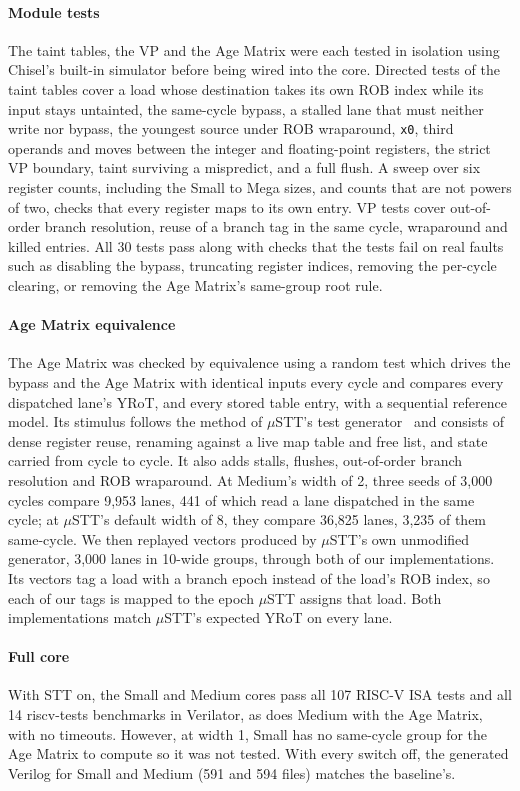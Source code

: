 
\paragraph{Module tests}
The taint tables, the VP and the Age Matrix were each tested in isolation
using Chisel's built-in simulator before being wired into the core. Directed
tests of the taint tables cover a load whose destination takes its own ROB
index while its input stays untainted, the same-cycle bypass, a stalled lane
that must neither write nor bypass, the youngest source under ROB wraparound,
\texttt{x0}, third operands and moves between the integer and floating-point
registers, the strict VP boundary, taint surviving a mispredict, and a full
flush. A sweep over six register counts, including the Small to Mega sizes, and
counts that are not powers of two, checks that every register maps to its
own entry. VP tests cover out-of-order branch resolution, reuse of a branch
tag in the same cycle, wraparound and killed entries. All 30 tests pass along with
checks that the tests fail on real faults such as disabling the bypass,
truncating register indices, removing the per-cycle clearing, or removing the
Age Matrix's same-group root rule.

\paragraph{Age Matrix equivalence}
The Age Matrix was checked by equivalence using a random test which drives the 
bypass and the Age Matrix with identical inputs every cycle and compares every 
dispatched lane's YRoT, and every stored table entry, with a sequential reference model.
Its stimulus follows the method of $\mu$STT's test generator~\cite{Chen:uSTT:2025} 
and consists of dense register reuse, renaming against a live map table and free list, 
and state carried from cycle to cycle. It also adds stalls, flushes, out-of-order 
branch resolution and ROB wraparound. 
At Medium's width of 2, three seeds of 3,000 cycles compare 9,953
lanes, 441 of which read a lane dispatched in the same cycle; at $\mu$STT's
default width of 8, they compare 36,825 lanes, 3,235 of them same-cycle. We
then replayed vectors produced by $\mu$STT's own unmodified generator, 3,000
lanes in 10-wide groups, through both of our implementations. Its vectors tag
a load with a branch epoch instead of the load's ROB index, so each of our
tags is mapped to the epoch $\mu$STT assigns that load. Both implementations
match $\mu$STT's expected YRoT on every lane.

\paragraph{Full core}
With STT on, the Small and Medium cores pass all 107 RISC-V ISA tests and all
14 riscv-tests benchmarks in Verilator, as does Medium with the Age Matrix,
with no timeouts. However, at width 1, Small has no same-cycle group for the Age Matrix
to compute so it was not tested. With every switch off, the generated Verilog for Small and Medium
(591 and 594 files) matches the baseline's.
